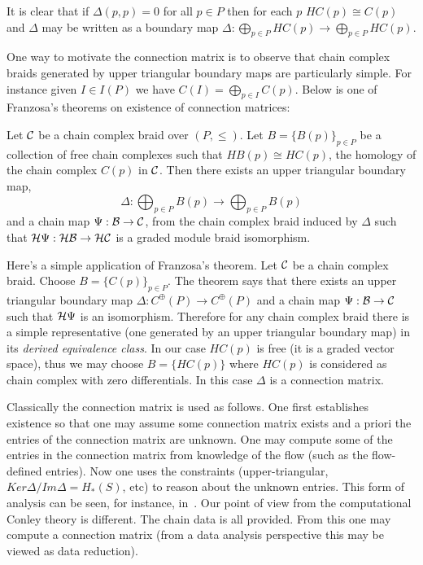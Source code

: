 It is clear that if $\Delta(p,p)=0$ for all $p\in P$ then for each $p$ $HC(p)\cong C(p)$ and $\Delta$ may be written as a boundary map $\Delta:\bigoplus_{p\in P} HC(p)\to \bigoplus_{p\in P} HC(p)$.

One way to motivate the connection matrix is to observe that chain complex braids generated by upper triangular boundary maps are particularly simple.  For instance given $I\in I(P)$ we have $C(I) = \bigoplus_{p\in I} C(p)$.  Below is one of Franzosa's theorems on existence of connection matrices:

\begin{thm}
Let ${\mathcal C}$ be a chain complex braid over $(P,\leq)$.  Let $B=\{B(p)\}_{p\in P}$ be a collection of free chain complexes such that $HB(p) \cong HC(p)$, the homology of the chain complex $C(p)$ in ${\mathcal C}$.  Then there exists an upper triangular boundary map, $$\Delta:\bigoplus_{p\in P} B(p)\to \bigoplus_{p\in P}B(p)$$ and a chain map $\Psi:{\mathcal B}\to {\mathcal C}$, from the chain complex braid induced by $\Delta$ such that ${\mathcal H}\Psi:{\mathcal H}{\mathcal B}\to {\mathcal H}{\mathcal C}$ is a graded module braid isomorphism.
\end{thm}

Here's a simple application of Franzosa's theorem.  Let ${\mathcal C}$ be a chain complex braid.  Choose $B = \{C(p)\}_{p\in P}$.  The theorem says that there exists an upper triangular boundary map $\Delta:C^\oplus(P)\to C^\oplus(P)$ and a chain map $\Psi:{\mathcal B}\to {\mathcal C}$ such that ${\mathcal H}\Psi$ is an isomorphism.  Therefore for any chain complex braid there is a simple representative (one generated by an upper triangular boundary map) in its {\em derived equivalence class}.  In our case $HC(p)$ is free (it is a graded vector space), thus we may choose $B=\{HC(p)\}$ where $HC(p)$ is considered as chain complex with zero differentials.  In this case $\Delta$ is a connection matrix.


\begin{rem}
Classically the connection matrix is used as follows.  One first establishes existence so that one may assume some connection matrix exists and a priori the entries of the connection matrix are unknown.  One may compute some of the entries in the connection matrix from knowledge of the flow (such as the flow-defined entries).  Now one uses the constraints (upper-triangular, $Ker\Delta/Im\Delta = H_*(S)$, etc) to reason about the unknown entries.  This form of analysis can be seen, for instance, in~\cite{}.  Our point of view from the computational Conley theory is different.  The chain data is all provided.  From this one may compute a connection matrix (from a data analysis perspective this may be viewed as data reduction). 
\end{rem}


